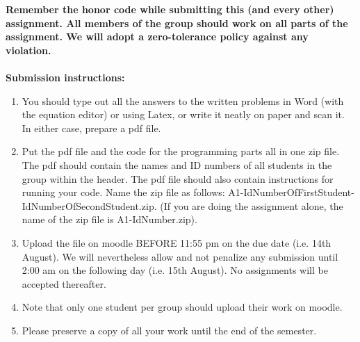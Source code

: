 \documentclass[11pt]{article}
\begin{document}
\maketitle

\textbf{Remember the honor code while submitting this (and every other) assignment. All members of the group should work on all parts of the assignment. We will adopt a \textbf{zero-tolerance policy} against any violation.}
\\
\\
\textbf{Submission instructions:} 
\begin{enumerate}
\item You should type out all the answers to the written problems in Word (with the equation editor) or using Latex, or write it neatly on paper and scan it. In either case, prepare a pdf file. 
\item Put the pdf file and the code for the programming parts all in one zip file. The pdf should contain the names and ID numbers of all students in the group within the header. The pdf file should also contain instructions for running your code. Name the zip file as follows: A1-IdNumberOfFirstStudent-IdNumberOfSecondStudent.zip. (If you are doing the assignment alone, the name of the zip file is A1-IdNumber.zip). 
\item Upload the file on moodle BEFORE 11:55 pm on the due date (i.e. 14th August). We will nevertheless allow and not penalize any submission until 2:00 am on the following day (i.e. 15th August). No assignments will be accepted thereafter. 
\item Note that only one student per group should upload their work on moodle. 
\item Please preserve a copy of all your work until the end of the semester. 
\end{enumerate}
\end{document}
